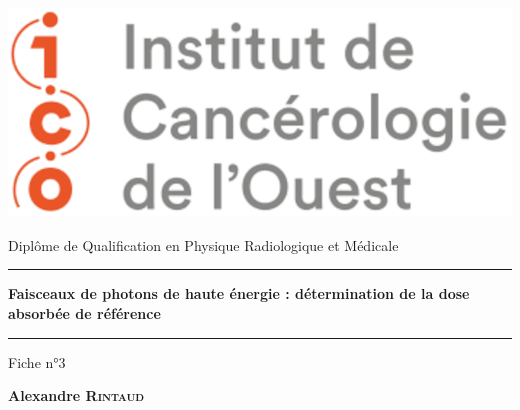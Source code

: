\begin{titlepage}

    \unitlength 1cm
    \begin{center}
    
    \vspace*{1cm}
    

    \includegraphics[scale=0.6]{figures/logo_ico.png}
    
    \vspace{2cm}
    
               {\Large Diplôme de Qualification en Physique Radiologique et Médicale\\}
               
    \vspace{2cm}           
    
    
    \rule{16cm}{0.7pt}
    
    \vspace{12pt}
               
               {\LARGE \bf Faisceaux de photons de haute énergie : détermination de la dose absorbée de référence\\}
               
    \vspace{12pt}
    \rule{16cm}{0.7pt}

    \vspace{2cm}

                {\large Fiche n°3}
    
    \vspace{1.5cm}

               {\Large\bf {Alexandre \textsc{Rintaud}}}
    

\end{center}
\end{titlepage}
